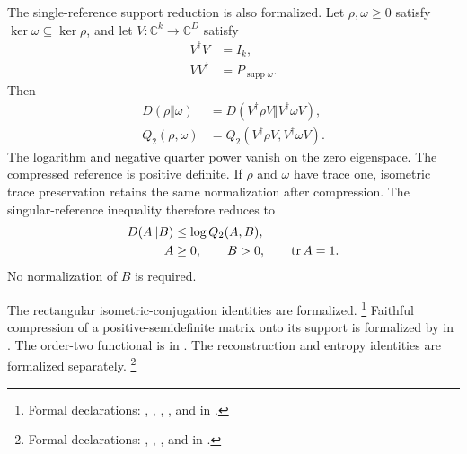 \documentclass[11pt]{article}
\begin{document}
The single-reference support reduction is also formalized. Let
$\rho,\omega\geq0$ satisfy $\ker\omega\subseteq\ker\rho$, and let
$V:\mathbb C^k\to\mathbb C^D$ satisfy
\begin{align}
    V^\dagger V
        &= I_k,
    \label{eq:cpgsv17_support_isometry_left_inverse}\\
    VV^\dagger
        &= P_{\operatorname{supp}\omega}.
    \label{eq:cpgsv17_support_isometry_range_projection}
\end{align}
Then
\begin{align}
    D(\rho\Vert\omega)
        &=
        D(V^\dagger\rho V\Vert V^\dagger\omega V),
    \label{eq:cpgsv17_relative_entropy_support_compression}\\
    Q_2(\rho,\omega)
        &=
        Q_2(V^\dagger\rho V,V^\dagger\omega V).
    \label{eq:cpgsv17_order_two_support_compression}
\end{align}
The logarithm and negative quarter power vanish on the zero eigenspace. The
compressed reference is positive definite. If $\rho$ and $\omega$ have trace
one, isometric trace preservation retains the same normalization after
compression. The singular-reference inequality therefore reduces to
\begin{align}
    D(A\Vert B)
        &\leq \log Q_2(A,B),
    \label{eq:cpgsv17_faithful_relative_entropy_comparison}\\
    A
        &\geq0,
    \qquad
    B>0,
    \qquad
    \operatorname{tr} A=1.
    \label{eq:cpgsv17_faithful_comparison_hypotheses}
\end{align}
No normalization of $B$ is required.

The rectangular isometric-conjugation identities are formalized.
\footnote{Formal declarations:
,
,
,
, and
in .}
Faithful compression of a positive-semidefinite matrix onto its support is
formalized by
 in
.
The order-two functional is
 in
.
The reconstruction and entropy identities are formalized separately.
\footnote{Formal declarations:
,
,
, and
in .}
\end{document}
